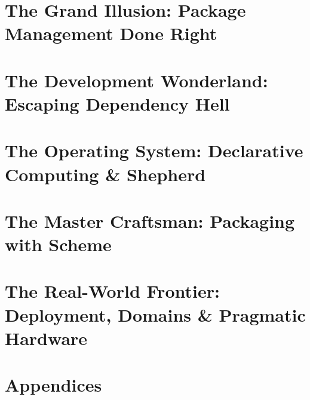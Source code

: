 \documentclass[11pt,a4paper,oneside]{book}
\begin{document}
\frontmatter


\tableofcontents
\listoftables


\mainmatter

\part{The Grand Illusion: Package Management Done Right}




\part{The Development Wonderland: Escaping Dependency Hell}



\part{The Operating System: Declarative Computing \& Shepherd}




\part{The Master Craftsman: Packaging with Scheme}




\part{The Real-World Frontier: Deployment, Domains \& Pragmatic Hardware}





\backmatter
\part*{Appendices}


\end{document}
